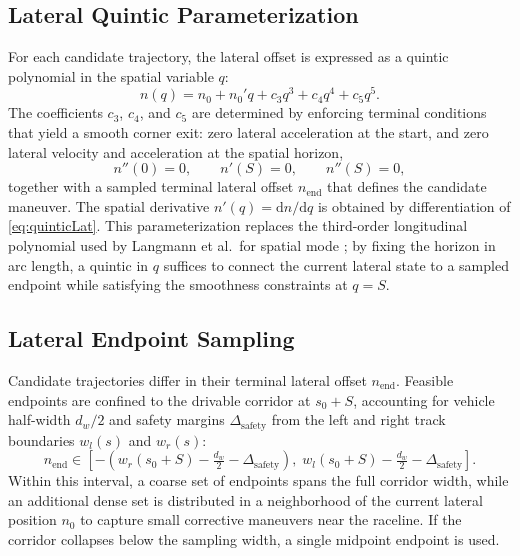\subsection{Lateral Quintic Parameterization}

For each candidate trajectory, the lateral offset is expressed as a quintic polynomial in the spatial variable $q$:
\begin{equation}
    n(q) = n_0 + n_0' q + c_3 q^3 + c_4 q^4 + c_5 q^5.
    \label{eq:quinticLat}
\end{equation}
The coefficients $c_3$, $c_4$, and $c_5$ are determined by enforcing terminal conditions that yield a smooth corner exit: zero lateral acceleration at the start, and zero lateral velocity and acceleration at the spatial horizon,
\begin{equation}
    n''(0) = 0, \qquad n'(S) = 0, \qquad n''(S) = 0,
    \label{eq:quinticBC}
\end{equation}
together with a sampled terminal lateral offset $n_{\text{end}}$ that defines the candidate maneuver.
The spatial derivative $n'(q) = \mathrm{d}n/\mathrm{d}q$ is obtained by differentiation of \eqref{eq:quinticLat}.
This parameterization replaces the third-order longitudinal polynomial used by Langmann et al.\ for spatial mode \cite{langmann_OnlineVelocityProfile_2025}; by fixing the horizon in arc length, a quintic in $q$ suffices to connect the current lateral state to a sampled endpoint while satisfying the smoothness constraints at $q = S$.

\subsection{Lateral Endpoint Sampling}

Candidate trajectories differ in their terminal lateral offset $n_{\text{end}}$.
Feasible endpoints are confined to the drivable corridor at $s_0 + S$, accounting for vehicle half-width $d_w/2$ and safety margins $\Delta_{\text{safety}}$ from the left and right track boundaries $w_l(s)$ and $w_r(s)$:
\begin{equation}
    n_{\text{end}} \in \left[
        -\left(w_r(s_0 + S) - \tfrac{d_w}{2} - \Delta_{\text{safety}}\right),\;
        w_l(s_0 + S) - \tfrac{d_w}{2} - \Delta_{\text{safety}}
    \right].
    \label{eq:nEndBounds}
\end{equation}
Within this interval, a coarse set of endpoints spans the full corridor width, while an additional dense set is distributed in a neighborhood of the current lateral position $n_0$ to capture small corrective maneuvers near the raceline.
If the corridor collapses below the sampling width, a single midpoint endpoint is used.

